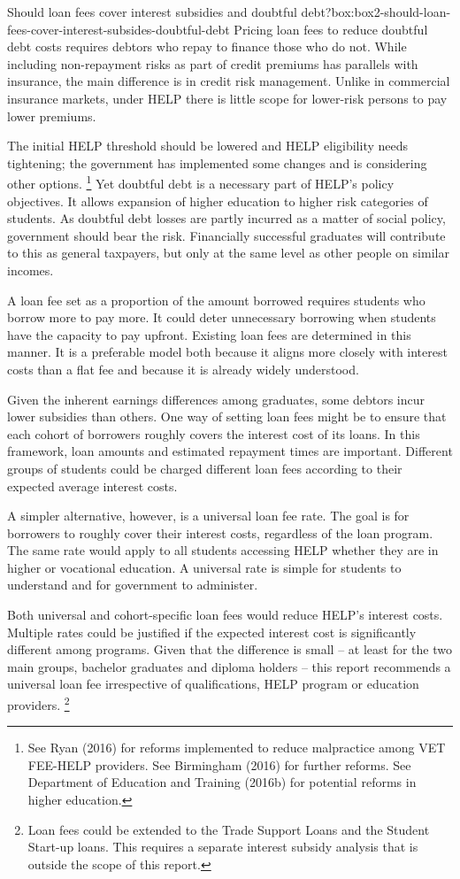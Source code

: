 \documentclass[embargoed]{grattan}
\begin{document}
\begin{bigbox*}{Should loan fees cover interest subsidies and doubtful debt?}{box:box2-should-loan-fees-cover-interest-subsides-doubtful-debt}
Pricing loan fees to reduce doubtful debt costs requires debtors who repay to finance those who do not.
While including non-repayment risks as part of credit premiums has parallels with insurance, the main difference is in credit risk management.
Unlike in commercial insurance markets, under HELP there is little scope for lower-risk persons to pay lower premiums.

The initial HELP threshold should be lowered and HELP eligibility needs tightening; the government has implemented some changes and is considering other options.%
\footnote{See Ryan (2016) for reforms implemented to reduce malpractice among VET FEE-HELP providers.
See Birmingham (2016) for further reforms.
See Department of Education and Training (2016b) for potential reforms in higher education.} Yet doubtful debt is a necessary part of HELP's policy objectives.
It allows expansion of higher education to higher risk categories of students.
As doubtful debt losses are partly incurred as a matter of social policy, government should bear the risk.
Financially successful graduates will contribute to this as general taxpayers, but only at the same level as other people on similar incomes.
\end{bigbox*}

A loan fee set as a proportion of the amount borrowed requires students who borrow more to pay more.
It could deter unnecessary borrowing when students have the capacity to pay upfront.
Existing loan fees are determined in this manner.
It is a preferable model both because it aligns more closely with interest costs than a flat fee and because it is already widely understood.

Given the inherent earnings differences among graduates, some debtors incur lower subsidies than others.
One way of setting loan fees might be to ensure that each cohort of borrowers roughly covers the interest cost of its loans.
In this framework, loan amounts and estimated repayment times are important.
Different groups of students could be charged different loan fees according to their expected average interest costs.

A simpler alternative, however, is a universal loan fee rate.
The goal is for borrowers to roughly cover their interest costs, regardless of the loan program.
The same rate would apply to all students accessing HELP whether they are in higher or vocational education.
A universal rate is simple for students to understand and for government to administer.

Both universal and cohort-specific loan fees would reduce HELP's interest costs.
Multiple rates could be justified if the expected interest cost is significantly different among programs.
Given that the difference is small -- at least for the two main groups, bachelor graduates and diploma holders -- this report recommends a universal loan fee irrespective of qualifications, HELP program or education providers.%
\footnote{Loan fees could be extended to the Trade Support Loans and the Student Start-up loans.
This requires a separate interest subsidy analysis that is outside the scope of this report.}
\end{document}
